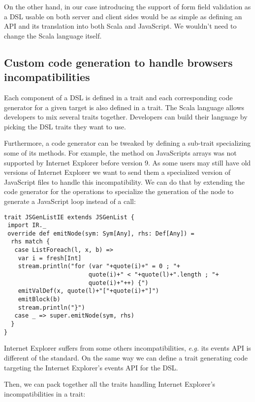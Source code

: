 \documentclass[american,english,runningheads]{llncs}
\newcommand{\eg}{\emph{e.g.}}
\begin{document}
On the other hand, in our case introducing the support of form field validation as a DSL usable on both server and client sides would be as simple as defining an API and its translation into both Scala and JavaScript. We wouldn’t need to change the Scala language itself.

\subsection{Custom code generation to handle browsers incompatibilities}

Each component of a DSL is defined in a trait and each corresponding code generator for a given target is also defined in a trait. The Scala language allows developers to mix several traits together. Developers can build their language by picking the DSL traits they want to use.

Furthermore, a code generator can be tweaked by defining a sub-trait specializing some of its methods. For example, the  method on JavaScripts arrays was not supported by Internet Explorer before version 9. As some users may still have old versions of Internet Explorer we want to send them a specialized version of JavaScript files to handle this incompatibility. We can do that by extending the code generator for the  operations to specialize the generation of the  node to generate a JavaScript  loop instead of a  call:

\begin{lstlisting}
trait JSGenListIE extends JSGenList {
 import IR._
 override def emitNode(sym: Sym[Any], rhs: Def[Any]) =
  rhs match {
   case ListForeach(l, x, b) =>
    var i = fresh[Int]
    stream.println("for (var "+quote(i)+" = 0 ; "+
                        quote(i)+" < "+quote(l)+".length ; "+
                        quote(i)+"++) {")
    emitValDef(x, quote(l)+"["+quote(i)+"]")
    emitBlock(b)
    stream.println("}")
   case _ => super.emitNode(sym, rhs)
  }
}
\end{lstlisting}

Internet Explorer suffers from some others incompatibilities, \eg{} its events API is different of the standard. On the same way we can define a  trait generating code targeting the Internet Explorer’s events API for the  DSL.

Then, we can pack together all the traits handling Internet Explorer’s incompatibilities in a  trait:
\end{document}
